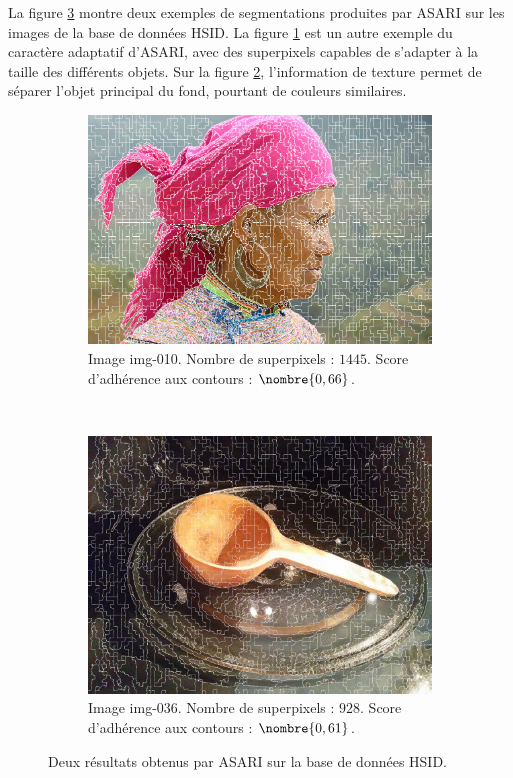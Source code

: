 La figure \ref{fig:asari-HSID} montre deux exemples de segmentations produites par ASARI sur les images de la base de données HSID. La figure \ref{fig:asari-HSID-1} est un autre exemple du caractère adaptatif d'ASARI, avec des superpixels capables de s'adapter à la taille des différents objets.  Sur la figure \ref{fig:asari-HSID-2}, l'information de texture permet de séparer l'objet principal du fond, pourtant de couleurs similaires.

\begin{figure}[htb]
        \centering
           \begin{subfigure}[t]{0.4\textwidth}
        \includegraphics[width=\textwidth]{images/asari/ASARI/HSID/img-010}
        \caption{Image img-010. Nombre de superpixels : $1445$. Score d'adhérence aux contours : $\nombre{0,66}$.} 
        \label{fig:asari-HSID-1}
        \end{subfigure}
        ~
           \begin{subfigure}[t]{0.4\textwidth}
        \includegraphics[width=\textwidth]{images/asari/ASARI/HSID/img-036}
        \caption{Image img-036. Nombre de superpixels : $928$. Score d'adhérence aux contours : $\nombre{0,61}$. }
        \label{fig:asari-HSID-2}
        \end{subfigure}
        \caption{Deux résultats obtenus par ASARI sur la base de données HSID.}
        \label{fig:asari-HSID}
\end{figure}




